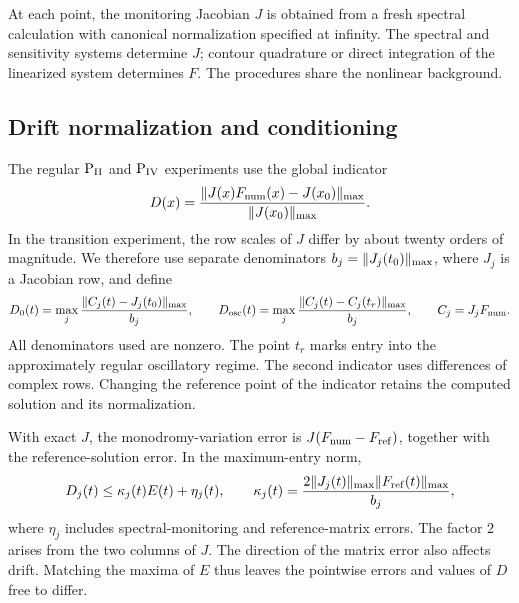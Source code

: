 At each point, the monitoring Jacobian $J$ is obtained from a fresh
spectral calculation with canonical normalization specified at infinity.
The spectral and sensitivity systems determine $J$; contour quadrature
or direct integration of the linearized system determines $F$.
The procedures share the nonlinear background.

\subsection{Drift normalization and conditioning}
The regular $\mathrm{P}_{\mathrm{II}}$ and $\mathrm{P}_{\mathrm{IV}}$ experiments use the global indicator
\begin{equation}\label{eq:global-drift}
 D(x)=\frac{\lVert J(x)F_{\rm num}(x)-J(x_0)\rVert_{\max}}{\lVert J(x_0)\rVert_{\max}}.
\end{equation}
In the transition experiment, the row scales of $J$ differ by about
twenty orders of magnitude. We therefore use separate denominators
$b_j=\lVert J_j(t_0)\rVert_{\max}$, where $J_j$ is a Jacobian row, and define
\begingroup\small
\begin{equation}\label{eq:row-drift}
 D_0(t)=\max_j\frac{\lVert C_j(t)-J_j(t_0)\rVert_{\max}}{b_j},\qquad
 D_{\rm osc}(t)=\max_j\frac{\lVert C_j(t)-C_j(t_r)\rVert_{\max}}{b_j},\qquad
 C_j=J_jF_{\rm num}.
\end{equation}
\endgroup
All denominators used are nonzero. The point $t_r$ marks entry into the
approximately regular oscillatory regime. The second indicator uses
differences of complex rows. Changing the reference point of the
indicator retains the computed solution and its normalization.

With exact $J$, the monodromy-variation error is
$J(F_{\rm num}-F_{\rm ref})$, together with the reference-solution error.
In the maximum-entry norm,
\begin{equation}\label{eq:conditioning}
 D_j(t)\le\kappa_j(t)E(t)+\eta_j(t),\qquad
 \kappa_j(t)=\frac{2\lVert J_j(t)\rVert_{\max}\lVert F_{\rm ref}(t)\rVert_{\max}}{b_j},
\end{equation}
where $\eta_j$ includes spectral-monitoring and reference-matrix errors.
The factor $2$ arises from the two columns of $J$.
The direction of the matrix error also affects drift. Matching the
maxima of $E$ thus leaves the pointwise errors and values of $D$ free
to differ.

